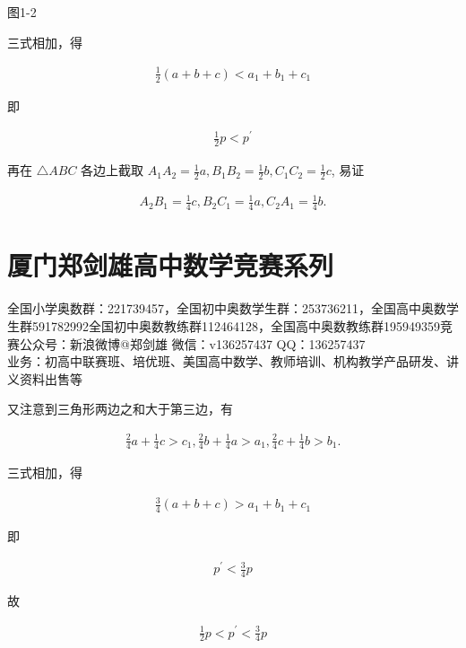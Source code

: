 \documentclass[10pt]{article}
\begin{document}
图1-2

三式相加，得

\begin{align*}
\frac{1}{2}(a+b+c)<a_{1}+b_{1}+c_{1}
\end{align*}

即

\begin{align*}
\frac{1}{2} p<p^{\prime}
\end{align*}

再在 $\triangle A B C$ 各边上截取 $A_{1} A_{2}=\frac{1}{2} a, B_{1} B_{2}=\frac{1}{2} b, C_{1} C_{2}=\frac{1}{2} c$, 易证

\begin{align*}
A_{2} B_{1}=\frac{1}{4} c, B_{2} C_{1}=\frac{1}{4} a, C_{2} A_{1}=\frac{1}{4} b .
\end{align*}

\section*{厦门郑剑雄高中数学竞赛系列}
全国小学奥数群：221739457，全国初中奥数学生群：253736211，全国高中奥数学生群591782992全国初中奥数教练群112464128，全国高中奥数教练群195949359竞赛公众号：新浪微博@郑剑雄 微信：v136257437 QQ：136257437\\
业务：初高中联赛班、培优班、美国高中数学、教师培训、机构教学产品研发、讲义资料出售等

又注意到三角形两边之和大于第三边，有

\begin{align*}
\frac{2}{4} a+\frac{1}{4} c>c_{1}, \frac{2}{4} b+\frac{1}{4} a>a_{1}, \frac{2}{4} c+\frac{1}{4} b>b_{1} .
\end{align*}

三式相加，得

\begin{align*}
\frac{3}{4}(a+b+c)>a_{1}+b_{1}+c_{1}
\end{align*}

即

\begin{align*}
p^{\prime}<\frac{3}{4} p
\end{align*}

故

\begin{align*}
\frac{1}{2} p<p^{\prime}<\frac{3}{4} p
\end{align*}
\end{document}

